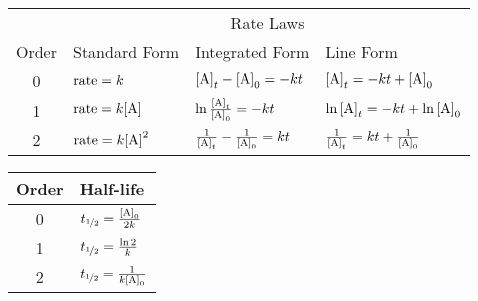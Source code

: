 \documentclass[10pt]{article}
\begin{document}
\begin{table}[H]
    \centering
        \begin{tabular}{clll}
            \toprule
                \multicolumn{1}{c}{} & \multicolumn{3}{c}{Rate Laws}\\
                \cmidrule(l){2-4} 
                Order & Standard Form & Integrated Form & Line Form \\
                \midrule
                0 & $\textnormal{rate}=k$ & $\textnormal{[A]}_t-\textnormal{[A]}_0=-kt$ & $\textnormal{[A]}_t=-kt+\textnormal{[A]}_0$   \\[10pt]
                1 & $\textnormal{rate}=k\textnormal{[A]}$ & $\ln\frac{\textnormal{[A]}_t}{\textnormal{[A]}_0}=-kt$ & $\ln\textnormal{[A]}_t=-kt+\ln\textnormal{[A]}_0$  \\[10pt]
                2 & $\textnormal{rate}=k\textnormal{[A]}^2$ & $\frac{1}{\textnormal{[A]}_t}-\frac{1}{\textnormal{[A]}_0}=kt$ & $\frac{1}{\textnormal{[A]}_t}=kt+\frac{1}{\textnormal{[A]}_0}$  \\
            \bottomrule
        \end{tabular}
    \label{tabrate}
\end{table}
\vspace*{-5pt}
\begin{table}[H]
    \centering
        \begin{tabular}{cl}
            \toprule
                Order & Half-life\\
                \midrule
                0 & $t_{\nicefrac{1}{2}}=\frac{\textnormal{[A]}_0}{2k}$ \\[10pt]
                1 & $t_{\nicefrac{1}{2}}=\frac{\ln 2}{k}$  \\[10pt]
                2 & $t_{\nicefrac{1}{2}}=\frac{1}{k\textnormal{[A]}_0}$  \\
            \bottomrule
        \end{tabular}
    \label{tabhalf}
\end{table}

\end{document}
